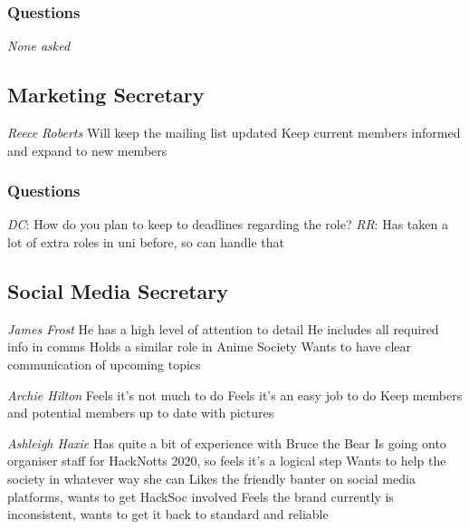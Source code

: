 \documentclass[11pt]{meetingmins}
\begin{document}
\subsubsection{Questions}
\textit{None asked}

\subsection{Marketing Secretary}
\begin{items}
	\item
	\textit{Reece Roberts}
		\subitem
		Will keep the mailing list updated
		\subitem
		Keep current members informed and expand to new members
\end{items}

\subsubsection{Questions}
\begin{items}
	\item
	\textit{DC}: How do you plan to keep to deadlines regarding the role?
		\subitem
		\textit{RR}:
			\subsubitem
			Has taken a lot of extra roles in uni before, so can handle that	
\end{items}

\subsection{Social Media Secretary}
\begin{items}
	\item
	\textit{James Frost}
		\subitem
		He has a high level of attention to detail
		\subitem
		He includes all required info in comms
		\subitem
		Holds a similar role in Anime Society
		\subitem
		Wants to have clear communication of upcoming topics
	
	\item
	\textit{Archie Hilton}
		\subitem
		Feels it’s not much to do
		\subitem
		Feels it’s an easy job to do
		\subitem
		Keep members and potential members up to date with pictures
	
	\item
	\textit{Ashleigh Haxie}
		\subitem
		Has quite a bit of experience with Bruce the Bear
		\subitem
		Is going onto organiser staff for HackNotts 2020, so feels it’s a logical step
		\subitem
		Wants to help the society in whatever way she can
		\subitem
		Likes the friendly banter on social media platforms, wants to get HackSoc involved
		\subitem
		Feels the brand currently is inconsistent, wants to get it back to standard and reliable
\end{items}
\end{document}
